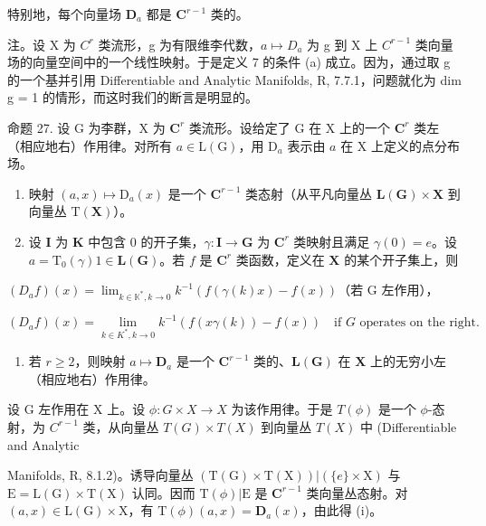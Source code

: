 特别地，每个向量场 \(\mathbf{D}_a\) 都是 \(\mathbf{C}^{r - 1}\) 类的。

注。设 X 为 \(C^{r}\) 类流形，g 为有限维李代数，\(a \mapsto D_{a}\) 为 g 到 X 上 \(C^{r-1}\) 类向量场的向量空间中的一个线性映射。于是定义 7 的条件 (a) 成立。因为，通过取 g 的一个基并引用 Differentiable and Analytic Manifolds, R, 7.7.1，问题就化为 dim g = 1 的情形，而这时我们的断言是明显的。

命题 27. 设 G 为李群，X 为 \(\mathbf{C}^r\) 类流形。设给定了 G 在 X 上的一个 \(\mathbf{C}^r\) 类左（相应地右）作用律。对所有 \(a \in \mathrm{L}(\mathrm{G})\)，用 \(\mathrm{D}_a\) 表示由 \(a\) 在 X 上定义的点分布场。

\begin{enumerate}
\def\labelenumi{(\roman{enumi})}
\item
  映射 \((a, x) \mapsto \mathrm{D}_a(x)\) 是一个 \(\mathbf{C}^{r-1}\) 类态射（从平凡向量丛 \(\mathbf{L}(\mathbf{G}) \times \mathbf{X}\) 到向量丛 \(\mathrm{T}(\mathbf{X})\)）。
\item
  设 \(\mathbf{I}\) 为 \(\mathbf{K}\) 中包含 0 的开子集，\(\gamma: \mathbf{I} \to \mathbf{G}\) 为 \(\mathbf{C}^r\) 类映射且满足 \(\gamma(0) = e\)。设 \(a = \mathrm{T}_0(\gamma) 1 \in \mathbf{L}(\mathbf{G})\)。若 \(f\) 是 \(\mathbf{C}^r\) 类函数，定义在 \(\mathbf{X}\) 的某个开子集上，则
\end{enumerate}

\((D_{a}f)(x) = \lim_{k\in \mathbb{K}^{*},k\to 0}k^{-1}(f(\gamma (k)x) - f(x))\)（若 G 左作用），

\[
(D _ {a} f) (x) = \lim _ {k \in K ^ {*}, k \rightarrow 0} k ^ {- 1} (f (x \gamma (k)) - f (x)) \quad \text {if } G \text { operates on the right}.
\]

\begin{enumerate}
\def\labelenumi{(\roman{enumi})}
\setcounter{enumi}{2}
\tightlist
\item
  若 \(r \geqslant 2\)，则映射 \(a \mapsto \mathbf{D}_a\) 是一个 \(\mathbf{C}^{r-1}\) 类的、\(\mathbf{L}(\mathbf{G})\) 在 \(\mathbf{X}\) 上的无穷小左（相应地右）作用律。
\end{enumerate}

设 G 左作用在 X 上。设 \(\phi: G \times X \to X\) 为该作用律。于是 \(T(\phi)\) 是一个 \(\phi\)-态射，为 \(C^{r-1}\) 类，从向量丛 \(T(G) \times T(X)\) 到向量丛 \(T(X)\) 中 (Differentiable and Analytic

Manifolds, R, 8.1.2)。诱导向量丛 \((\mathrm{T}(\mathrm{G}) \times \mathrm{T}(\mathrm{X}))|(\{e\} \times \mathrm{X})\) 与 \(\mathrm{E} = \mathrm{L}(\mathrm{G}) \times \mathrm{T}(\mathrm{X})\) 认同。因而 \(\mathrm{T}(\phi)|\mathrm{E}\) 是 \(\mathbf{C}^{r-1}\) 类向量丛态射。对 \((a, x) \in \mathrm{L}(\mathrm{G}) \times \mathrm{X}\)，有 \(\mathrm{T}(\phi)(a, x) = \mathbf{D}_{a}(x)\)，由此得 (i)。

